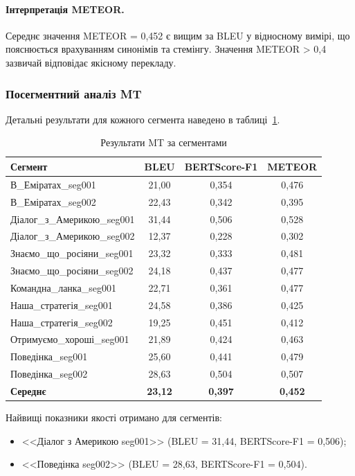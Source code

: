 \paragraph{Інтерпретація METEOR.}
Середнє значення METEOR = 0,452 є вищим за BLEU у відносному вимірі,
що пояснюється врахуванням синонімів та стемінгу. Значення METEOR > 0,4
зазвичай відповідає якісному перекладу.

\subsubsection{Посегментний аналіз MT}

Детальні результати для кожного сегмента наведено в таблиці~\ref{tab:mt_detailed}.

\begin{table}[h]
\centering
\caption{Результати MT за сегментами}
\label{tab:mt_detailed}
\small
\begin{tabular}{|l|c|c|c|}
\hline
\textbf{Сегмент} & \textbf{BLEU} & \textbf{BERTScore-F1} & \textbf{METEOR} \\
\hline
В\_Еміратах\_seg001 & 21,00 & 0,354 & 0,476 \\
В\_Еміратах\_seg002 & 22,43 & 0,342 & 0,395 \\
Діалог\_з\_Америкою\_seg001 & 31,44 & 0,506 & 0,528 \\
Діалог\_з\_Америкою\_seg002 & 12,37 & 0,228 & 0,302 \\
Знаємо\_що\_росіяни\_seg001 & 23,32 & 0,333 & 0,481 \\
Знаємо\_що\_росіяни\_seg002 & 24,18 & 0,437 & 0,477 \\
Командна\_ланка\_seg001 & 22,71 & 0,361 & 0,477 \\
Наша\_стратегія\_seg001 & 24,58 & 0,386 & 0,425 \\
Наша\_стратегія\_seg002 & 19,25 & 0,451 & 0,412 \\
Отримуємо\_хороші\_seg001 & 21,89 & 0,424 & 0,463 \\
Поведінка\_seg001 & 25,60 & 0,441 & 0,479 \\
Поведінка\_seg002 & 28,63 & 0,504 & 0,507 \\
\hline
\textbf{Середнє} & \textbf{23,12} & \textbf{0,397} & \textbf{0,452} \\
\hline
\end{tabular}
\end{table}

Найвищі показники якості отримано для сегментів:
\begin{itemize}
    \item <<Діалог з Америкою seg001>> (BLEU = 31,44, BERTScore-F1 = 0,506);
    \item <<Поведінка seg002>> (BLEU = 28,63, BERTScore-F1 = 0,504).
\end{itemize}

